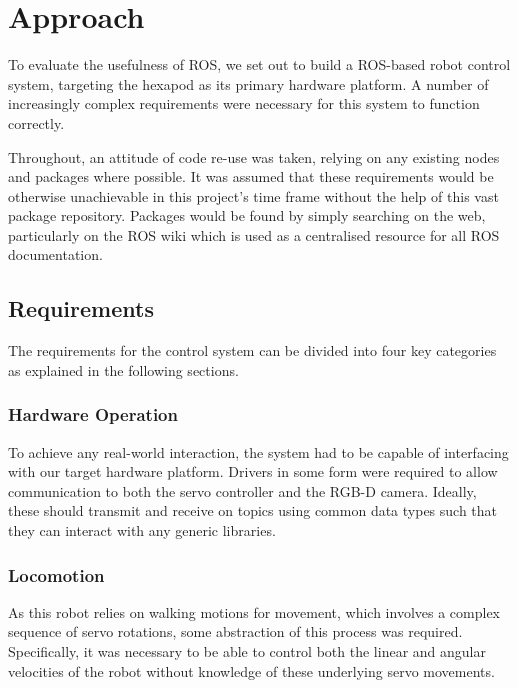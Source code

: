 \chapter{Approach}
\label{chap:approach}

To evaluate the usefulness of ROS, we set out to build a ROS-based robot control system, targeting the hexapod as its primary hardware platform. A number of increasingly complex requirements were necessary for this system to function correctly.

Throughout, an attitude of code re-use was taken, relying on any existing nodes and packages where possible. It was assumed that these requirements would be otherwise unachievable in this project's time frame without the help of this vast package repository. Packages would be found by simply searching on the web, particularly on the ROS wiki which is used as a centralised resource for all ROS documentation.


\section{Requirements}

The requirements for the control system can be divided into four key categories as explained in the following sections.

\subsection{Hardware Operation}

To achieve any real-world interaction, the system had to be capable of interfacing with our target hardware platform. Drivers in some form were required to allow communication to both the servo controller and the RGB-D camera. Ideally, these should transmit and receive on topics using common data types such that they can interact with any generic libraries.

\subsection{Locomotion}

As this robot relies on walking motions for movement, which involves a complex sequence of servo rotations, some abstraction of this process was required. Specifically, it was necessary to be able to control both the linear and angular velocities of the robot without knowledge of these underlying servo movements.

